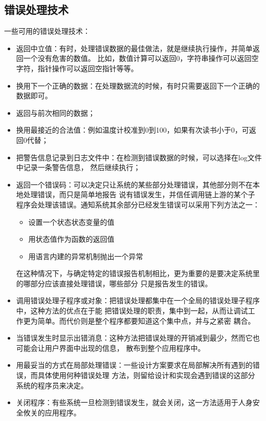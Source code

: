 \documentclass{article}
\begin{document}
\subsection{错误处理技术}
一些可用的错误处理技术：
\begin{itemize}
    \item 返回中立值：有时，处理错误数据的最佳做法，就是继续执行操作，并简单返回一个没有危害的数值。
    比如，数值计算可以返回0，字符串操作可以返回空字符，指针操作可以返回空指针等等。
    \item 换用下一个正确的数据：在处理数据流的时候，有时只需要返回下一个正确的数据即可。
    \item 返回与前次相同的数据；
    \item 换用最接近的合法值：例如温度计校准到0到100，如果有次读书小于0，可返回0代替；
    \item 把警告信息记录到日志文件中：在检测到错误数据的时候，可以选择在log文件中记录一条警告信息，
    然后继续执行；
    \item 返回一个错误码：可以决定只让系统的某些部分处理错误，其他部分则不在本地处理错误，而只是简单地报告
    说有错误发生，并信任调用链上游的某个子程序会处理该错误。通知系统其余部分已经发生错误可以采用下列方法之一：
    \begin{itemize}
        \item 设置一个状态状态变量的值
        \item 用状态值作为函数的返回值
        \item 用语言内建的异常机制抛出一个异常
    \end{itemize}
    在这种情况下，与确定特定的错误报告机制相比，更为重要的是要决定系统里的哪部分应该直接处理错误，哪些部分
    只是报告发生的错误。
    \item 调用错误处理子程序或对象：把错误处理都集中在一个全局的错误处理子程序中，这种方法的优点在于能
    把错误处理的职责，集中到一起，从而让调试工作更为简单。而代价则是整个程序都要知道这个集中点，并与之紧密
    耦合。
    \item 当错误发生时显示出错消息：这种方法把错误处理的开销减到最少，然而它也可能会让用户界面中出现的信息，
    散布到整个应用程序中。
    \item 用最妥当的方式在局部处理错误：一些设计方案要求在局部解决所有遇到的错误，而具体使用何种错误处理
    方法，则留给设计和实现会遇到错误的这部分系统的程序员来决定。
    \item 关闭程序：有些系统一旦检测到错误发生，就会关闭，这一方法适用于人身安全攸关的应用程序。
\end{itemize}
\end{document}

